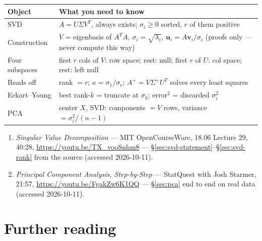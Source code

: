 \begin{center}
\begin{tabularx}{\textwidth}{l>{\raggedright\arraybackslash}X}
\toprule
\textbf{Object} & \textbf{What you need to know}\\
\midrule
SVD & $A=U\Sigma V^{T}$, always exists; $\sigma_i\ge0$ sorted, $r$ of
them positive \\
Construction & $V$ = eigenbasis of $A^{T}A$, $\sigma_i=\sqrt{\lambda_i}$,
$\mathbf u_i=A\mathbf v_i/\sigma_i$ (proofs only --- never compute this
way) \\
Four subspaces & first $r$ cols of $V$: row space; rest: null; first $r$
of $U$: col space; rest: left null \\
Reads off & rank $=r$; $\kappa=\sigma_1/\sigma_r$;
$A^{+}=V\Sigma^{+}U^{T}$ solves every least squares \\
Eckart--Young & best rank-$k$ = truncate at $\sigma_k$; error$^2$ =
discarded $\sigma_i^{2}$ \\
PCA & center $X$, SVD: components $=V$ rows, variance $=\sigma_i^2/(n-1)$
\\
\bottomrule
\end{tabularx}
\end{center}
\begin{rulebox}
\begin{enumerate}
\item \emph{Singular Value Decomposition} --- MIT OpenCourseWare,
18.06 Lecture 29, 40:28, \url{https://youtu.be/TX_vooSnhm8} ---
\S\ref{sec:svd-statement}--\S\ref{sec:svd-rank} from the source
(accessed 2026-10-11).
\item \emph{Principal Component Analysis, Step-by-Step} --- StatQuest
with Josh Starmer, 21:57, \url{https://youtu.be/FgakZw6K1QQ} ---
\S\ref{sec:pca} end to end on real data (accessed 2026-10-11).
\end{enumerate}
\end{rulebox}

\section*{Further reading}

